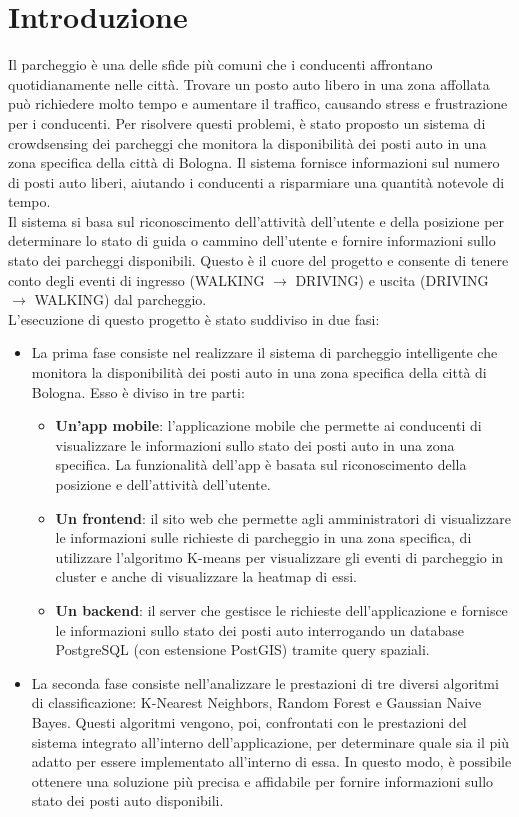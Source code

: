 \documentclass[../../Report.tex]{subfiles}
\begin{document}
    \chapter{Introduzione}
    Il parcheggio è una delle sfide più comuni che i conducenti affrontano quotidianamente nelle città. Trovare un posto auto libero in una zona affollata può richiedere molto tempo e aumentare il traffico, causando stress e frustrazione per i conducenti. Per risolvere questi problemi, è stato proposto un sistema di crowdsensing dei parcheggi che monitora la disponibilità dei posti auto in una zona specifica della città di Bologna. Il sistema fornisce informazioni sul numero di posti auto liberi, aiutando i conducenti a risparmiare una quantità notevole di tempo.\\
    Il sistema si basa sul riconoscimento dell'attività dell'utente e della posizione per determinare lo stato di guida o cammino dell'utente e fornire informazioni sullo stato dei parcheggi disponibili. Questo è il cuore del progetto e consente di tenere conto degli eventi di ingresso (WALKING $\rightarrow$ DRIVING) e uscita (DRIVING $\rightarrow$ WALKING) dal parcheggio.\\
    L'esecuzione di questo progetto è stato suddiviso in due fasi:
    \begin{itemize}
        \item La prima fase consiste nel realizzare il sistema di parcheggio intelligente che monitora la disponibilità dei posti auto in una zona specifica della città di Bologna. Esso è diviso in tre parti:
        \begin{itemize}
            \item \textbf{Un'app mobile}: l'applicazione mobile che permette ai conducenti di visualizzare le informazioni sullo stato dei posti auto in una zona specifica. La funzionalità dell'app è basata sul riconoscimento della posizione e dell'attività dell'utente.
            \item \textbf{Un frontend}: il sito web che permette agli amministratori di visualizzare le informazioni sulle richieste di parcheggio in una zona specifica, di utilizzare l'algoritmo K-means per visualizzare gli eventi di parcheggio in cluster e anche di visualizzare la heatmap di essi.
            \item \textbf{Un backend}: il server che gestisce le richieste dell'applicazione e fornisce le informazioni sullo stato dei posti auto interrogando un database PostgreSQL (con estensione PostGIS) tramite query spaziali.
        \end{itemize}
        \item La seconda fase consiste nell'analizzare le prestazioni di tre diversi algoritmi di classificazione: K-Nearest Neighbors, Random Forest e Gaussian Naive Bayes. Questi algoritmi vengono, poi, confrontati con le prestazioni del sistema integrato all'interno dell'applicazione, per determinare quale sia il più adatto per essere implementato all'interno di essa. In questo modo, è possibile ottenere una soluzione più precisa e affidabile per fornire informazioni sullo stato dei posti auto disponibili. 
    \end{itemize}
\end{document}
